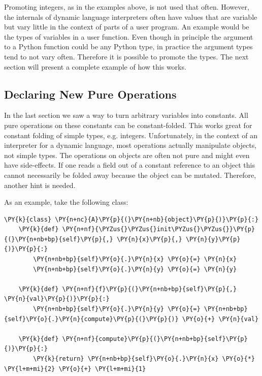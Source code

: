 \documentclass{sig-alternate}
\begin{document}
Promoting integers, as in the examples above, is not used that often.
However, the internals of dynamic language interpreters often
have values that are variable but vary little in the context of parts of a user
program. An example would be the types of variables in a user function. Even
though in principle the argument to a Python function could be any Python type,
in practice the argument types tend to not vary often. Therefore it is possible to
promote the types. The next section will present a complete example of how
this works.


\subsection{Declaring New Pure Operations}

In the last section we saw a way to turn arbitrary variables into constants. All
pure operations on these constants can be constant-folded. This works great for
constant folding of simple types, e.g. integers. Unfortunately, in the context of an
interpreter for a dynamic
language, most operations actually manipulate objects, not simple types. The
operations on objects are often not pure and might even have side-effects. If
one reads a field out of a constant reference to an object this cannot
necessarily be folded away because the object can be mutated. Therefore, another
hint is needed.

As an example, take the following class:

\begin{Verbatim}[commandchars=\\\{\}]
\PY{k}{class} \PY{n+nc}{A}\PY{p}{(}\PY{n+nb}{object}\PY{p}{)}\PY{p}{:}
    \PY{k}{def} \PY{n+nf}{\PYZus{}\PYZus{}init\PYZus{}\PYZus{}}\PY{p}{(}\PY{n+nb+bp}{self}\PY{p}{,} \PY{n}{x}\PY{p}{,} \PY{n}{y}\PY{p}{)}\PY{p}{:}
        \PY{n+nb+bp}{self}\PY{o}{.}\PY{n}{x} \PY{o}{=} \PY{n}{x}
        \PY{n+nb+bp}{self}\PY{o}{.}\PY{n}{y} \PY{o}{=} \PY{n}{y}

    \PY{k}{def} \PY{n+nf}{f}\PY{p}{(}\PY{n+nb+bp}{self}\PY{p}{,} \PY{n}{val}\PY{p}{)}\PY{p}{:}
        \PY{n+nb+bp}{self}\PY{o}{.}\PY{n}{y} \PY{o}{=} \PY{n+nb+bp}{self}\PY{o}{.}\PY{n}{compute}\PY{p}{(}\PY{p}{)} \PY{o}{+} \PY{n}{val}

    \PY{k}{def} \PY{n+nf}{compute}\PY{p}{(}\PY{n+nb+bp}{self}\PY{p}{)}\PY{p}{:}
        \PY{k}{return} \PY{n+nb+bp}{self}\PY{o}{.}\PY{n}{x} \PY{o}{*} \PY{l+m+mi}{2} \PY{o}{+} \PY{l+m+mi}{1}
\end{Verbatim}
\end{document}
